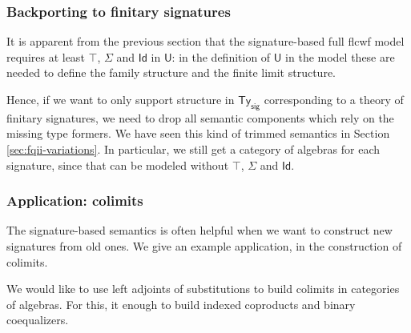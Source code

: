 \documentclass[12pt,a4paper,twoside,openany]{book}
\theoremstyle{remark}
\theoremstyle{definition}
\theoremstyle{theorem}
\newcommand{\ms}[1]{\mathsf{#1}}
\newcommand{\bs}[1]{\boldsymbol{#1}}
\newcommand{\Tys}{\ms{Ty_{sig}}}
\newcommand{\U}{\mathsf{U}}
\newcommand{\Id}{\mathsf{Id}}
\newcommand{\bU}{\bs{\U}}
\begin{document}
\subsubsection{Backporting to finitary signatures}

It is apparent from the previous section that the signature-based full flcwf
model requires at least $\top$, $\Sigma$ and $\Id$ in $\U$: in the definition of
$\bU$ in the model these are needed to define the family structure and the
finite limit structure.

Hence, if we want to only support structure in $\Tys$ corresponding to a theory
of finitary signatures, we need to drop all semantic components which rely on
the missing type formers. We have seen this kind of trimmed semantics in Section
\ref{sec:fqii-variations}. In particular, we still get a category of algebras
for each signature, since that can be modeled without $\top$, $\Sigma$ and
$\Id$.

\subsubsection{Application: colimits}

The signature-based semantics is often helpful when we want to construct new
signatures from old ones. We give an example application, in the construction of
colimits.

We would like to use left adjoints of substitutions to build colimits in
categories of algebras. For this, it enough to build indexed coproducts and
binary coequalizers.
\end{document}
